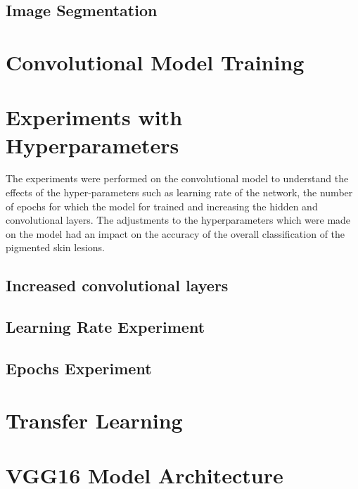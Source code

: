 \subsection{ Image Segmentation }

\pagebreak
\section{Convolutional Model Training}


\pagebreak
\section{Experiments with Hyperparameters}
The experiments were performed on the convolutional model to understand the effects of the hyper-parameters 
such as learning rate of the network, the number of epochs for which the model for trained and increasing the hidden  
and convolutional layers. The adjustments to the hyperparameters which were made on the model had an impact on the accuracy of the overall classification of the pigmented skin lesions.

\subsection{Increased convolutional layers}


\subsection{Learning Rate Experiment}


\subsection{Epochs Experiment}


\pagebreak
\section{Transfer Learning}

\pagebreak
\section{VGG16 Model Architecture}